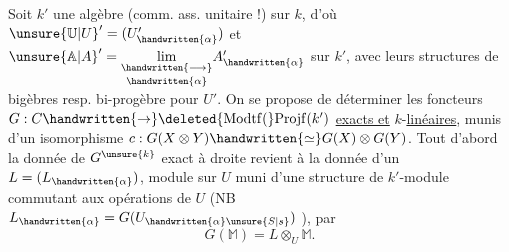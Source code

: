 Soit $k'$ une algèbre (comm. ass. unitaire !) sur $k$, d'où $\unsure{\mathbb{U}|U}'=(U'_{\handwritten{\alpha}})$ et $\unsure{\mathbb{A}|A}'=\underset{\handwritten{\alpha}}{\underset{\handwritten{\longrightarrow}}{\lim}}A'_{\handwritten{\alpha}}$ sur $k'$, avec leurs structures de bigèbres \handwritten{(}resp. bi-progèbre pour $U'$\handwritten{)}. On se propose de déterminer les foncteurs $G:C\handwritten{\to}\deleted{\mathrm{Modtf}(}\mathrm{Projf}(k')$ \uline{exacts et} $k$-\uline{linéaires}, munis d'un isomorphisme $c:G(X\otimes Y)\handwritten{\simeq}G(X)\otimes G(Y)$.  Tout d'abord la donnée de $G^{\unsure{k}}$ exact à droite revient à la donnée d'un $L=(L_{\handwritten{\alpha}})$, module sur $U$\handwritten{,} muni d'une structure de $k'$-module  commutant aux opérations de $U$ (NB $L_{\handwritten{\alpha}}=G(U_{\handwritten{\alpha}\unsure{S|s}})$ ), par
\[
G(\mathbb{M})=L\otimes_U\mathbb{M}.
\]

